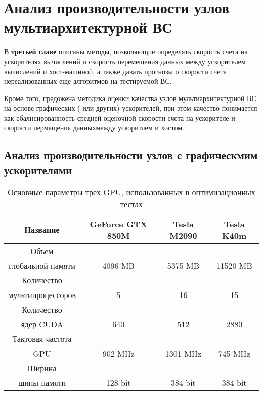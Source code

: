 \chapter{Анализ производительности узлов мультиархитектурной ВС} \label{chapt3}
В \textbf{третьей главе} описаны методы, позволяющие определять скорость счета на ускорителях вычислений и скорость перемещения данных между ускорителем вычислений и хост-машиной, а также давать прогнозы о скорости счета нереализованных еще алгоритмов на тестируемой ВС.

Кроме того, предожена методика оценки качества узлов мультиархитектурной ВС на основе графических ( или других) ускорителей, при этом качество понимается как сбалнсированность средней оценочной скорости счета на ускорителе и скорости пермещения данныхмежду ускоритлем и хостом. 

\section{Анализ производительности узлов с графическмим ускорителями} \label{sect3_1}

\begin{table}[ht]
	\begin{center}
		\caption{Основные параметры трех GPU, использованных в оптимизационных тестах}
		\begin{tabular}{|c|c|c|c|}
			\hline
			Название                &  GeForce GTX 850M & Tesla M2090 & Tesla K40m \\ \hline
			Объем                  &                   &             &             \\
			глобальной памяти       & 4096 MB           & 5375 MB     & 11520 MB \\ \hline
			Количество              &             &               &     \\
			мультипроцессоров       & 5           &  16           & 15  \\ \hline
			Количество              &             &               &     \\
			ядер CUDA               & 640         & 512         & 2880  \\ \hline
			Тактовая частота        &             &             &         \\
			GPU                     & 902 MHz     & 1301 MHz    & 745 MHz \\ \hline
			Ширина                  &             &             &         \\
			шины памяти             & 128-bit     & 384-bit     & 384-bit \\ \hline
		\end{tabular}
		\label{GPUs}
	\end{center}
\end{table}


